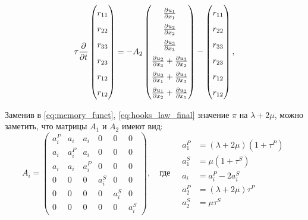\documentclass[a4paper, fontsize=14pt]{article}
\begin{document}
\begin{equation}
    \label{eq:system_on_r}
    \renewcommand\arraystretch{1.6}
    \tau \frac{\partial }{\partial t}
    \begin{pmatrix} 
        r_{11} \\
        r_{22} \\
        r_{33} \\
        r_{23} \\
        r_{12} \\
        r_{12} 
    \end{pmatrix} 
    = - A_2 
    \begin{pmatrix} 
        \frac{\partial u_1}{\partial x_1} \\
        \frac{\partial u_2}{\partial x_2} \\
        \frac{\partial u_3}{\partial x_3} \\
        \frac{\partial u_2}{\partial x_3} + \frac{\partial u_3}{\partial x_2} \\
        \frac{\partial u_3}{\partial x_1} + \frac{\partial u_1}{\partial x_3} \\
        \frac{\partial u_1}{\partial x_2} + \frac{\partial u_2}{\partial x_1}
        \end{pmatrix} -
        \begin{pmatrix} 
        r_{11} \\
        r_{22} \\
        r_{33} \\
        r_{23} \\
        r_{12} \\
        r_{12} 
        \end{pmatrix},
\end{equation}

Заменив в \eqref{eq:memory_funct}, \eqref{eq:hooks_law_final} значение $\pi$ на $\lambda + 2 \mu$, можно заметить, что матрицы $A_1$ и $A_2$ имеют вид:
\begin{equation}
    A_i = 
    \begin{pmatrix}
        a_i^P & a_i & a_i & 0 & 0 & 0 \\ 
        a_i & a_i^P & a_i & 0 & 0 & 0 \\ 
        a_i & a_i & a_i^P & 0 & 0 & 0 \\ 
        0 & 0 & 0  & a_i^S & 0 & 0 \\
        0 & 0 & 0  & 0  & a_i^S & 0 \\
        0 & 0 & 0  & 0 & 0 & a_i^S
    \end{pmatrix},
    \quad
    \text{где}
    \quad
    \begin{aligned}
        a_1^P &= (\lambda + 2 \mu) (1 + \tau^P) \\
        a_1^S &= \mu(1 + \tau^S) \\
        a_i &= a_i^P - 2 a_i^S \\
        a_2^P &= (\lambda + 2 \mu) \tau^P \\
        a_2^S &= \mu \tau^S
    \end{aligned}
\end{equation}
\end{document}
